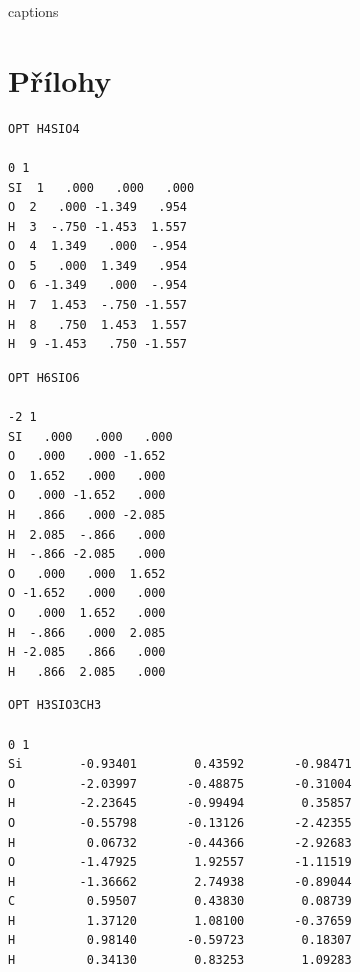 \documentclass[
  printed, %
  table,   %
  lof,     %
  lot,     %
  oneside,
]{fithesis3}
\begin{document}
{\csname captions\languagename\endcsname %
\makeatletter %
  \thesis@selectLocale{\thesis@locale}\makeatother
\printbibliography[heading=bibintoc]} %
\appendix %
\chapter{Přílohy}
 \begin{lstlisting}[frame=single, caption={\ce{H4SiO4} },label=DescriptiveLabel]
OPT H4SIO4 

0 1
SI  1   .000   .000   .000 
O  2   .000 -1.349   .954 
H  3  -.750 -1.453  1.557 
O  4  1.349   .000  -.954 
O  5   .000  1.349   .954 
O  6 -1.349   .000  -.954 
H  7  1.453  -.750 -1.557 
H  8   .750  1.453  1.557 
H  9 -1.453   .750 -1.557 
 \end{lstlisting}

 \begin{lstlisting}[frame=single, caption={\ce{(H6SiO6)^{2-}} },label=DescriptiveLabel]
OPT H6SIO6 

-2 1
SI   .000   .000   .000  
O   .000   .000 -1.652 
O  1.652   .000   .000 
O   .000 -1.652   .000 
H   .866   .000 -2.085 
H  2.085  -.866   .000 
H  -.866 -2.085   .000 
O   .000   .000  1.652 
O -1.652   .000   .000 
O   .000  1.652   .000 
H  -.866   .000  2.085 
H -2.085   .866   .000 
H   .866  2.085   .000
 \end{lstlisting}
  
  \newpage
  
  \begin{lstlisting}[frame=single, caption={\ce{H3SiO3CH3}},label=DescriptiveLabel]
OPT H3SIO3CH3

0 1
Si        -0.93401        0.43592       -0.98471
O         -2.03997       -0.48875       -0.31004
H         -2.23645       -0.99494        0.35857
O         -0.55798       -0.13126       -2.42355
H          0.06732       -0.44366       -2.92683
O         -1.47925        1.92557       -1.11519
H         -1.36662        2.74938       -0.89044
C          0.59507        0.43830        0.08739
H          1.37120        1.08100       -0.37659
H          0.98140       -0.59723        0.18307
H          0.34130        0.83253        1.09283
 \end{lstlisting}
\end{document}
